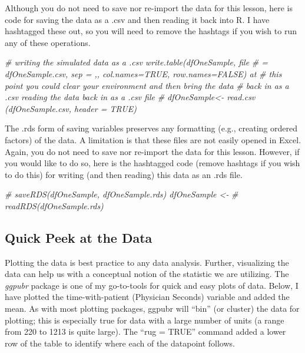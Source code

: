 \documentclass[
  11pt,
]{book}
\newenvironment{Shaded}{\begin{snugshade}}{\end{snugshade}}
\newcommand{\CommentTok}[1]{\textcolor[rgb]{0.37,0.37,0.37}{\textit{#1}}}
\begin{document}
Although you do not need to save nor re-import the data for this lesson, here is code for saving the data as a .csv and then reading it back into R. I have hashtagged these out, so you will need to remove the hashtags if you wish to run any of these operations.

\begin{Shaded}
\begin{Highlighting}[]
\CommentTok{\# writing the simulated data as a .csv write.table(dfOneSample, file}
\CommentTok{\# = \textquotesingle{}dfOneSample.csv\textquotesingle{}, sep = \textquotesingle{},\textquotesingle{}, col.names=TRUE, row.names=FALSE) at}
\CommentTok{\# this point you could clear your environment and then bring the data}
\CommentTok{\# back in as a .csv reading the data back in as a .csv file}
\CommentTok{\# dfOneSample\textless{}{-} read.csv (\textquotesingle{}dfOneSample.csv\textquotesingle{}, header = TRUE)}
\end{Highlighting}
\end{Shaded}

The .rds form of saving variables preserves any formatting (e.g., creating ordered factors) of the data. A limitation is that these files are not easily opened in Excel. Again, you do not need to save nor re-import the data for this lesson. However, if you would like to do so, here is the hashtagged code (remove hashtags if you wish to do this) for writing (and then reading) this data as an .rds file.

\begin{Shaded}
\begin{Highlighting}[]
\CommentTok{\# saveRDS(dfOneSample, \textquotesingle{}dfOneSample.rds\textquotesingle{}) dfOneSample \textless{}{-}}
\CommentTok{\# readRDS(\textquotesingle{}dfOneSample.rds\textquotesingle{})}
\end{Highlighting}
\end{Shaded}

\hypertarget{quick-peek-at-the-data}{%
\subsection{Quick Peek at the Data}\label{quick-peek-at-the-data}}

Plotting the data is best practice to any data analysis. Further, visualizing the data can help us with a conceptual notion of the statistic we are utilizing. The \emph{ggpubr} package is one of my go-to-tools for quick and easy plots of data. Below, I have plotted the time-with-patient (Physician Seconds) variable and added the mean. As with most plotting packages, ggpubr will ``bin'' (or cluster) the data for plotting; this is especially true for data with a large number of units (a range from 220 to 1213 is quite large). The ``rug = TRUE'' command added a lower row of the table to identify where each of the datapoint follows.
\end{document}

